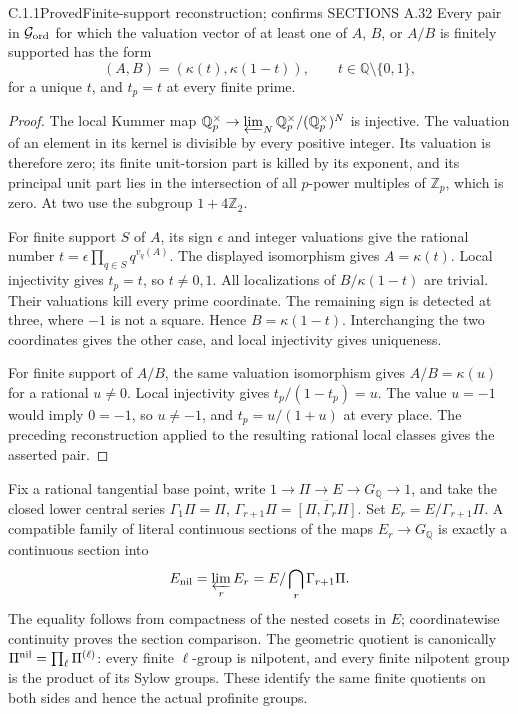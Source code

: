 \begin{result}{C.1.1}{Proved}{Finite-support reconstruction; confirms SECTIONS A.32}
\label{prop:ghost-finite-support}
Every pair in \(\mathcal G_{\rm ord}\) for which the valuation
vector of at least one of \(A\), \(B\), or \(A/B\) is
finitely supported has the form
\[
       (A,B)=(\kappa(t),\kappa(1-t)),
       \qquad t\in\mathbb Q\setminus\{0,1\},
\]
for a unique \(t\), and \(t_p=t\) at every finite prime.
\end{result}
\begin{proof}
The local Kummer map \(\mathbb Q_p^\times\to
\varprojlim_N\mathbb Q_p^\times/(\mathbb Q_p^\times)^N\)
is injective. The valuation of an element in its kernel is divisible
by every positive integer. Its valuation is therefore zero; its
finite unit-torsion part is killed by its exponent, and its principal
unit part lies in the intersection of all \(p\)-power multiples of
\(\mathbb Z_p\), which is zero. At two use the subgroup
\(1+4\mathbb Z_2\).

For finite support \(S\) of \(A\), its sign \(\epsilon\) and
integer valuations give the rational number
\(t=\epsilon\prod_{q\in S}q^{v_q(A)}\). The displayed
isomorphism gives \(A=\kappa(t)\). Local injectivity gives
\(t_p=t\), so \(t\ne0,1\). All localizations of
\(B/\kappa(1-t)\) are trivial. Their valuations kill every prime
coordinate. The remaining sign is detected at three, where
\(-1\) is not a square. Hence \(B=\kappa(1-t)\). Interchanging
the two coordinates gives the other case, and local injectivity
gives uniqueness.

For finite support of \(A/B\), the same valuation isomorphism
gives \(A/B=\kappa(u)\) for a rational \(u\ne0\). Local
injectivity gives \(t_p/(1-t_p)=u\). The value \(u=-1\)
would imply \(0=-1\), so \(u\ne-1\), and
\(t_p=u/(1+u)\) at every place. The preceding reconstruction
applied to the resulting rational local classes gives the
asserted pair.
\end{proof}

Fix a rational tangential base point, write
\(1\to\Pi\to E\to G_{\mathbb Q}\to1\), and take the closed
lower central series \(\Gamma_1\Pi=\Pi\),
\(\Gamma_{r+1}\Pi=\overline{[\Pi,\Gamma_r\Pi]}\).
Set \(E_r=E/\Gamma_{r+1}\Pi\). A compatible family of literal
continuous sections of the maps \(E_r\to G_{\mathbb Q}\) is
exactly a continuous section into
\[
 E_{\rm nil}=\varprojlim_rE_r
       =E/\bigcap_r\Gamma_{r+1}\Pi.
\]
The equality follows from compactness of the nested cosets in
\(E\); coordinatewise continuity proves the section comparison.
The geometric quotient is canonically
\(\Pi^{\rm nil}=\prod_\ell\Pi^{(\ell)}\): every finite
\(\ell\)-group is nilpotent, and every finite nilpotent group
is the product of its Sylow groups. These identify the same finite
quotients on both sides and hence the actual profinite groups.

